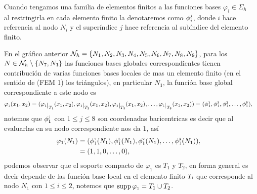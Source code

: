 Cuando tengamos una familia de elementos finitos  a las funciones bases $\varphi_{i}\in\Sigma_{h}$ al restringirla en cada elemento finito la denotaremos como $\phi^{\text{\tiny $j$}}_{i}$, donde $i$ hace referencia al nodo $N_{i}$ y el super\'indice $j$ hace referencia al sub\'indice del elemento finito. 

En el gr\'afico anterior ${\mathcal{N}}_{h}=\{ N_{1},N_{2},N_{3},N_{4},N_{5},N_{6},N_{7},N_{8},N_{9} \}$, para los   $N\in{\ensuremath{\mathcal{N}}}_{h}\setminus \{ N_{7},N_{3} \}$ las funciones bases globales correspondientes tienen contribuci\'on de varias funciones bases locales de mas un elemento finito (en el sentido de (FEM 1) los tri\'angulos), en particular  $N_{1}$, la funci\'on base global correspondiente a este nodo es $$\varphi_{\text{\tiny 1}}(x_{1},x_{2})=(\varphi_{\text{\tiny 1}}\restr{T_{1}}(x_{1},x_{2}) , \varphi_{\text{\tiny 1}}\restr{T_{2}}(x_{1},x_{2}),\varphi_{\text{\tiny 1}}\restr{T_{3}}(x_{1},x_{2}),\ldots,\varphi_{\text{\tiny 1}}\restr{T_{8}}(x_{1},x_{2}))=(\phi^{\text{\tiny 1}}_{1},\phi^{\text{\tiny 3}}_{1},\phi^{\text{\tiny 2}}_{1},\ldots,\phi^{\text{\tiny 8}}_{1}), $$
notemos que $\phi_{1}^{\text{\tiny j}}$ con $1\leq j\leq 8$ son coordenadas baricentricas es decir que al evaluarlas en su nodo correspondiente nos da $1$, as\'i 
\begin{equation*}
\begin{split}
\varphi_{1}(N_{1})&=(\phi^{\text{\tiny 1}}_{1}(N_{1}),\phi^{\text{\tiny 3}}_{1}(N_{1}),\phi^{\text{\tiny 2}}_{1}(N_{1}),\ldots,\phi^{\text{\tiny 8}}_{1}(N_{1})),\\
&=(1,1,0,\ldots,0),
\end{split}
\end{equation*}
podemos observar que el soporte compacto de $\varphi_{1}$ es $T_{1}$ y $T_{2}$, en forma general 
es decir depende de las funci\'on base local en el elemento finito $\text{\small $T_{i}$}$ que corresponde al nodo $N_{1}$ con $1\leq i\leq 2$, notemos que $\operatorname{supp}\varphi_{\text{\tiny 1}}=T_{1}\cup T_{2}$. 

